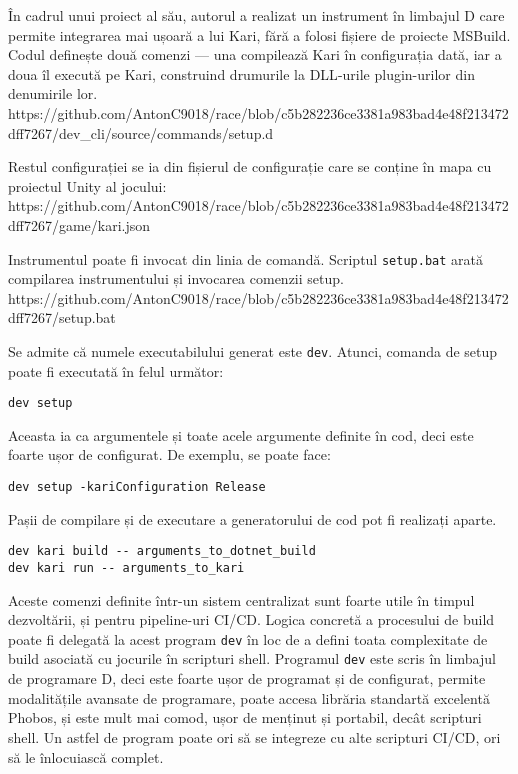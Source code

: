 \documentclass[a4paper,12pt]{report}
\begin{document}
În cadrul unui proiect al său, autorul a realizat un instrument în limbajul D care permite integrarea mai ușoară a lui Kari, fără a folosi fișiere de proiecte MSBuild.
Codul definește două comenzi — una compilează Kari în configurația dată, iar a doua îl execută pe Kari, construind drumurile la \ac{DLL}-urile plugin-urilor din denumirile lor.
https://github.com/AntonC9018/race/blob/c5b282236ce3381a983bad4e48f213472dff7267/dev_cli/source/commands/setup.d

Restul configurației se ia din fișierul de configurație care se conține în mapa cu proiectul Unity al jocului:
https://github.com/AntonC9018/race/blob/c5b282236ce3381a983bad4e48f213472dff7267/game/kari.json

Instrumentul poate fi invocat din linia de comandă.
Scriptul \texttt{setup.bat} arată compilarea instrumentului și invocarea comenzii setup.
https://github.com/AntonC9018/race/blob/c5b282236ce3381a983bad4e48f213472dff7267/setup.bat

Se admite că numele executabilului generat este \texttt{dev}.
Atunci, comanda de setup poate fi executată în felul următor:

\begin{verbatim}
dev setup
\end{verbatim}

Aceasta ia ca argumentele și toate acele argumente definite în cod, deci este foarte ușor de configurat.
De exemplu, se poate face:

\begin{verbatim}
dev setup -kariConfiguration Release
\end{verbatim}

Pașii de compilare și de executare a generatorului de cod pot fi realizați aparte.

\begin{verbatim}
dev kari build -- arguments_to_dotnet_build
dev kari run -- arguments_to_kari
\end{verbatim}

Aceste comenzi definite într-un sistem centralizat sunt foarte utile în timpul dezvoltării, și pentru pipeline-uri \ac{CI/CD}.
Logica concretă a procesului de build poate fi delegată la acest program \texttt{dev} în loc de a defini toata complexitate de build asociată cu jocurile în scripturi shell.
Programul \texttt{dev} este scris în limbajul de programare D, deci este foarte ușor de programat și de configurat, permite modalitățile avansate de programare, poate accesa librăria standartă excelentă Phobos, și este mult mai comod, ușor de menținut și portabil, decât scripturi shell.
Un astfel de program poate ori să se integreze cu alte scripturi \ac{CI/CD}, ori să le înlocuiască complet.
\end{document}
